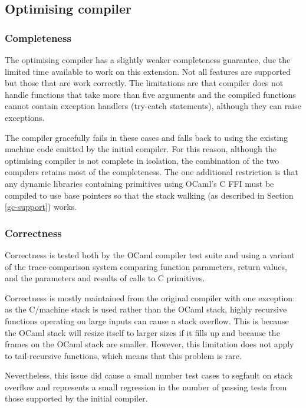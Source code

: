 \subsection{Optimising compiler} \label{eval-opt-comp-qual}

\subsubsection{Completeness}

The optimising compiler has a slightly weaker completeness guarantee, due the limited time
available to work on this extension. Not all features are supported but those that are work
correctly. The limitations are that compiler does not handle functions that take more than five
arguments and the compiled functions cannot contain exception handlers (try-catch statements),
although they can raise exceptions.

The compiler gracefully fails in these cases and falls back to using the existing machine code
emitted by the initial compiler. For this reason, although the optimising compiler is not complete
in isolation, the combination of the two compilers retains most of the completeness. The one
additional restriction is that any dynamic libraries containing primitives using OCaml's C FFI must
be compiled to use base pointers so that the stack walking (as described in Section
\ref{gc-support}) works.

\subsubsection{Correctness}

Correctness is tested both by the OCaml compiler test suite and using a variant of the
trace-comparison system comparing function parameters, return values, and the parameters and
results of calls to C primitives.

Correctness is mostly maintained from the original compiler with one exception: as the C/machine
stack is used rather than the OCaml stack, highly recursive functions operating on large inputs can
cause a stack overflow. This is because the OCaml stack will resize itself to larger sizes if it
fills up and because the frames on the OCaml stack are smaller.  However, this limitation does not
apply to tail-recursive functions, which means that this problem is rare.

Nevertheless, this issue did cause a small number test cases to segfault on stack overflow and
represents a small regression in the number of passing tests from those supported by the initial
compiler.

